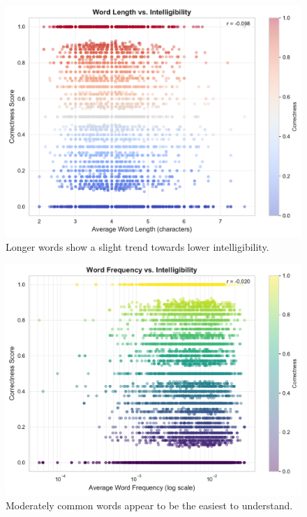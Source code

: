 \documentclass[conference]{IEEEtran}
\begin{document}
\begin{figure}[htbp]
    \centering
    \includegraphics[width=\columnwidth]{plots/figure_3_word_length.pdf}
    \caption{Longer words show a slight trend towards lower intelligibility.}
    \label{fig:word_length}
\end{figure}

\begin{figure}[htbp]
    \centering
    \includegraphics[width=\columnwidth]{plots/figure_4_word_frequency.pdf}
    \caption{Moderately common words appear to be the easiest to understand.}
    \label{fig:word_freq}
\end{figure}
\end{document}
